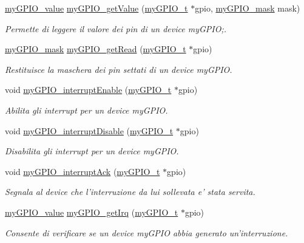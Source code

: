 \begin{DoxyCompactItemize}
\hyperlink{group__my_g_p_i_o_gaf634fe4a0e1eab8da5000b72d6ad362b}{my\+G\+P\+I\+O\+\_\+value} \hyperlink{group__my_g_p_i_o_gad6576f1d0fb17d9b492da0b1008550d0}{my\+G\+P\+I\+O\+\_\+get\+Value} (\hyperlink{structmy_g_p_i_o__t}{my\+G\+P\+I\+O\+\_\+t} $\ast$gpio, \hyperlink{group__my_g_p_i_o_ga402a0d20afc0cb7c25554b8b023f4253}{my\+G\+P\+I\+O\+\_\+mask} mask)
\begin{DoxyCompactList}\small\item\em Permette di leggere il valore dei pin di un device my\+G\+P\+I\+O;. \end{DoxyCompactList}\item 
\hyperlink{group__my_g_p_i_o_ga402a0d20afc0cb7c25554b8b023f4253}{my\+G\+P\+I\+O\+\_\+mask} \hyperlink{group__my_g_p_i_o_gadb3ecd03ea82420488977134c9313e18}{my\+G\+P\+I\+O\+\_\+get\+Read} (\hyperlink{structmy_g_p_i_o__t}{my\+G\+P\+I\+O\+\_\+t} $\ast$gpio)
\begin{DoxyCompactList}\small\item\em Restituisce la maschera dei pin settati di un device my\+G\+P\+I\+O. \end{DoxyCompactList}\item 
void \hyperlink{group__my_g_p_i_o_ga39822bfa495a9388e81ced74884c06a2}{my\+G\+P\+I\+O\+\_\+interrupt\+Enable} (\hyperlink{structmy_g_p_i_o__t}{my\+G\+P\+I\+O\+\_\+t} $\ast$gpio)
\begin{DoxyCompactList}\small\item\em Abilita gli interrupt per un device my\+G\+P\+I\+O. \end{DoxyCompactList}\item 
void \hyperlink{group__my_g_p_i_o_gab681db0119860bfad2c3e674289d8b3d}{my\+G\+P\+I\+O\+\_\+interrupt\+Disable} (\hyperlink{structmy_g_p_i_o__t}{my\+G\+P\+I\+O\+\_\+t} $\ast$gpio)
\begin{DoxyCompactList}\small\item\em Disabilita gli interrupt per un device my\+G\+P\+I\+O. \end{DoxyCompactList}\item 
void \hyperlink{group__my_g_p_i_o_ga396f6e5e7f0eeff01e98fcc78523402b}{my\+G\+P\+I\+O\+\_\+interrupt\+Ack} (\hyperlink{structmy_g_p_i_o__t}{my\+G\+P\+I\+O\+\_\+t} $\ast$gpio)
\begin{DoxyCompactList}\small\item\em Segnala al device che l'interruzione da lui sollevata e' stata servita. \end{DoxyCompactList}\item 
\hyperlink{group__my_g_p_i_o_gaf634fe4a0e1eab8da5000b72d6ad362b}{my\+G\+P\+I\+O\+\_\+value} \hyperlink{group__my_g_p_i_o_ga7936b506b45f116de68ddf06c84cc242}{my\+G\+P\+I\+O\+\_\+get\+Irq} (\hyperlink{structmy_g_p_i_o__t}{my\+G\+P\+I\+O\+\_\+t} $\ast$gpio)
\begin{DoxyCompactList}\small\item\em Consente di verificare se un device my\+G\+P\+I\+O abbia generato un'interruzione. \end{DoxyCompactList}\end{DoxyCompactItemize}


